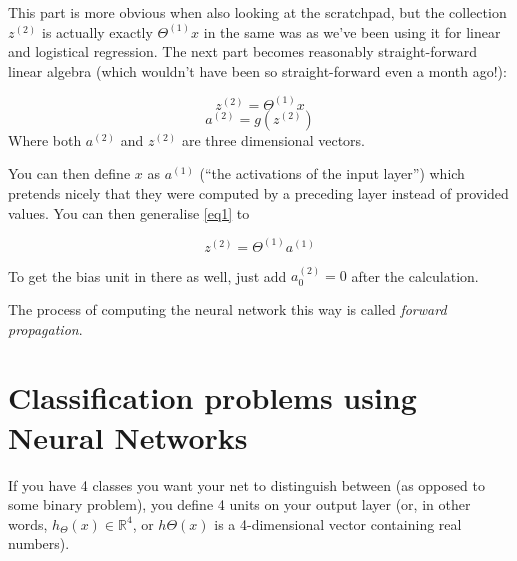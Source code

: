This part is more obvious when also looking at the scratchpad, but the collection $z^{(2)}$ is actually exactly $\Theta^{(1)}x$ in the same was as we've been using it for linear and logistical regression. The next part becomes reasonably straight-forward linear algebra (which wouldn't have been so straight-forward even a month ago!):

\begin{equation}
	\label{eq1}
	z^{(2)} = \Theta^{(1)}x
\end{equation}
\begin{equation}
	a^{(2)} = g(z^{(2)})
\end{equation}
Where both $a^{(2)}$ and $z^{(2)}$ are three dimensional vectors.

You can then define $x$ as $a^{(1)}$ (``the activations of the input layer'') which pretends nicely that they were computed by a preceding  layer instead of provided values. You can then generalise \eqref{eq1} to

\begin{equation}
	z^{(2)} = \Theta^{(1)}a^{(1)}
\end{equation}

To get the bias unit in there as well, just add $a_0^{(2)} = 0$ after the calculation.

The process of computing the neural network this way is called \emph{forward propagation}.

\section{Classification problems using Neural Networks}

If you have 4 classes you want your net to distinguish between (as opposed to some binary problem), you define 4 units on your output layer (or, in other words, $h_\Theta(x) \in \mathds{R}^4$, or $h\Theta(x)$ is a 4-dimensional vector containing real numbers).